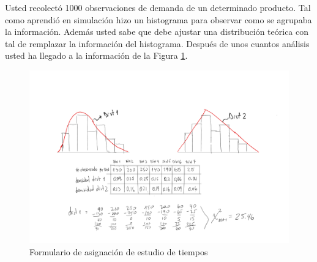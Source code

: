 \documentclass[11pt]{exam}
\begin{document}
\begin{questions}
\question Usted recolect\'o 1000 observaciones de demanda de un determinado producto. Tal como aprendi\'o en simulaci\'on hizo un histograma para observar como se agrupaba la informaci\'on. Adem\'as usted sabe que debe ajustar una distribuci\'on te\'orica con tal de remplazar la informaci\'on del histograma. Despu\'es de unos cuantos an\'alisis usted ha llegado a la informaci\'on de la Figura \ref{fig:chi2}.
 
\begin{figure}[htbp]
\centering
		\includegraphics[scale=0.43,keepaspectratio,trim={2cm 7cm 6cm 2cm},clip,angle =0]{chi2.png}
			\caption{Formulario de asignaci\'on de estudio de tiempos}
			\label{fig:chi2}
\end{figure}



\end{questions}
\end{document}
